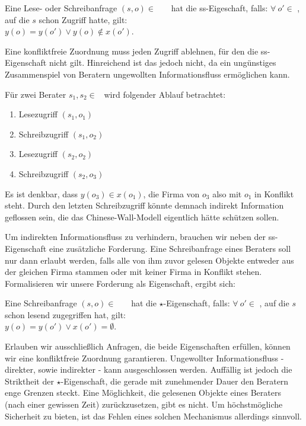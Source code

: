 \bigskip
\begin{definition}
	Eine Lese- oder Schreibanfrage \((s, o) \in\) \calS\ \ctsProd\ \calO\ hat die ss-Eigeschaft, falls: \(\forall\ o' \in\) \calO, auf die \(s\) schon Zugriff hatte, gilt:\\ \(y(o) = y(o') \lor y(o) \notin x(o')\).
\end{definition}
\bigskip

Eine konfliktfreie Zuordnung muss jeden Zugriff ablehnen, für den die ss-Eigenschaft nicht gilt. Hinreichend ist das jedoch nicht, da ein ungünstiges Zusammenspiel von Beratern ungewollten Informationsfluss ermöglichen kann.

\bigskip
\begin{beispiel}
	Für zwei Berater \(s_1, s_2 \in\) \calS\ wird folgender Ablauf betrachtet:
	\begin{multicols}{2}
		\begin{enumerate}
			\item Lesezugriff \((s_1, o_1)\)
			\item Schreibzugriff \((s_1, o_2)\)
			\item Lesezugriff \((s_2, o_2)\)
			\item Schreibzugriff \((s_2, o_3)\)
		\end{enumerate}
	\end{multicols}
	Es ist denkbar, dass \(y(o_3) \in x(o_1)\), die Firma von \(o_3\) also mit \(o_1\) in Konflikt steht. Durch den letzten Schreibzugriff könnte demnach indirekt Information geflossen sein, die das Chinese-Wall-Modell eigentlich hätte schützen sollen. 
\end{beispiel}
\bigskip

Um indirekten Informationsfluss zu verhindern, brauchen wir neben der ss-Eigenschaft eine zusätzliche Forderung. Eine Schreibanfrage eines Beraters soll nur dann erlaubt werden, falls alle von ihm zuvor gelesen Objekte entweder aus der gleichen Firma stammen oder mit keiner Firma in Konflikt stehen. Formalisieren wir unsere Forderung als Eigenschaft, ergibt sich:

\bigskip
\begin{definition}
	Eine Schreibanfrage \((s, o) \in\) \calS\ \ctsProd\ \calO\ hat die \(\star\)-Eigenschaft, falls: \(\forall\ o' \in\) \calO, auf die \(s\) schon lesend zugegriffen hat, gilt:\\ \(y(o) = y(o') \lor x(o') = \emptyset\).
\end{definition}
\bigskip

Erlauben wir ausschließlich Anfragen, die beide Eigenschaften erfüllen, können wir eine konfliktfreie Zuordnung garantieren. Ungewollter Informationsfluss - direkter, sowie indirekter - kann ausgeschlossen werden. Auffällig ist jedoch die Striktheit der \(\star\)-Eigenschaft, die gerade mit zunehmender Dauer den Beratern enge Grenzen steckt. Eine Möglichkeit, die gelesenen Objekte eines Beraters (nach einer gewissen Zeit) zurückzusetzen, gibt es nicht. Um höchstmögliche Sicherheit zu bieten, ist das Fehlen eines solchen Mechanismus allerdings sinnvoll.
